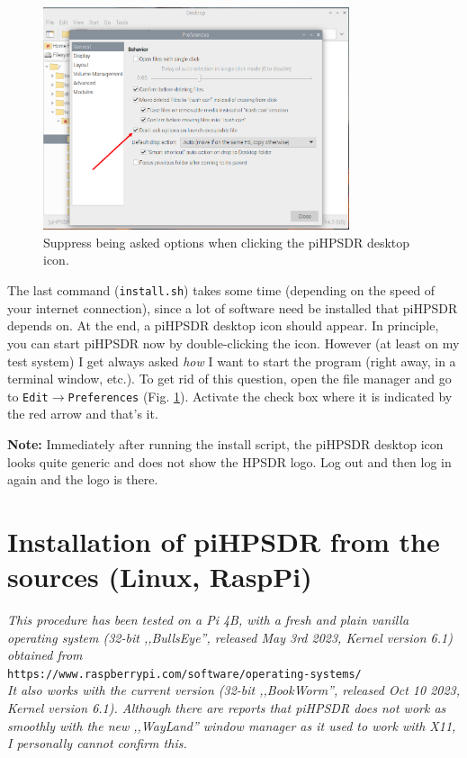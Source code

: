 \documentclass[12pt]{book}
\begin{document}
\begin{figure}[ht]
\center
\includegraphics[width=9cm]{piDontAsk.png}
\caption{Suppress being asked options when clicking the piHPSDR desktop icon.}
\label{fig:piDontAsk}
\end{figure}

The last command  (\texttt{install.sh}) takes some time (depending on the speed of your internet connection),
since a lot of software need be installed that piHPSDR depends on. At the end, a piHPSDR desktop
icon should appear. In principle, you can start piHPSDR now by double-clicking the icon.
However (at least on my test system) I get always asked \textit{how} I want to
start the program (right away, in a terminal window, etc.).
To get rid of this question, open the file manager
and go to
\texttt{Edit}$\to$\texttt{Preferences} (Fig. \ref{fig:piDontAsk}). Activate the check
box where it is indicated by the red arrow and that's it.


\textbf{Note:} Immediately after running the install script, the piHPSDR desktop icon
looks quite generic and does not show the HPSDR logo. Log out and then log in again
and the logo is there.

\chapter[Linux: piHPDSR install from sources]{Installation of piHPSDR from the sources (Linux, RaspPi)}
\label{sec:installsources}
\textit{This procedure has been tested on a Pi 4B, with a fresh and plain vanilla operating
system (32-bit ,,BullsEye'', released May 3rd 2023, Kernel version 6.1) obtained from} \\
\texttt{https://www.raspberrypi.com/software/operating-systems/} \\
\textit{It also works with the current
version (32-bit ,,BookWorm'', released Oct 10 2023, Kernel version 6.1). Although there are reports
that piHPSDR does not work as smoothly with the new ,,WayLand'' window manager as it used to work
with X11,
I personally cannot confirm this.}
\end{document}
